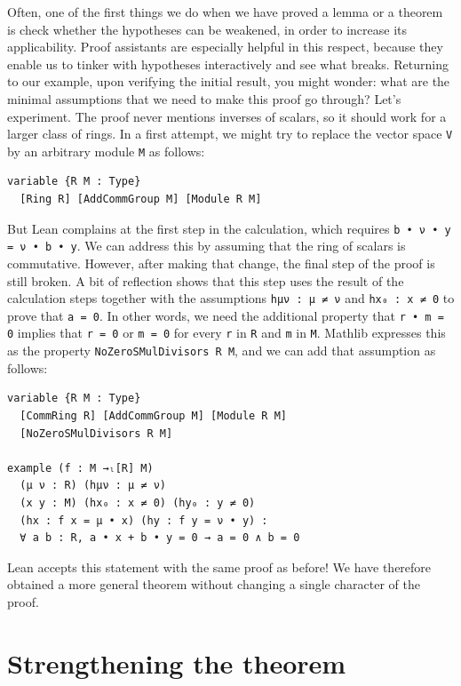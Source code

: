 \documentclass[11pt]{article}
\def\lean{\lstinline[language=lean]}
\begin{document}
Often, one of the first things we do when we have proved a lemma or a theorem is check whether the hypotheses can be weakened, in order to increase its applicability.
Proof assistants are especially helpful in this respect, because they enable us to tinker with hypotheses interactively and see what breaks.
Returning to our example, upon verifying the initial result, you might wonder:
what are the minimal assumptions that we need to make this proof go through?
Let's experiment.
The proof never mentions inverses of scalars,
so it should work for a larger class of rings.
In a first attempt, we might try to replace the vector space \lstinline{V}
by an arbitrary module \lstinline{M} as follows:
\begin{lstlisting}
variable {R M : Type}
  [Ring R] [AddCommGroup M] [Module R M]
\end{lstlisting}
But Lean complains at
the first step in the calculation, which requires
\lean"b • ν • y = ν • b • y".
We can address this by assuming
that the ring of scalars is commutative.
However, after making that change, the final step of the proof is still broken.
A bit of reflection shows that this step uses
the result of the calculation steps together with the assumptions
\lean"hμν : μ ≠ ν" and \lean"hx₀ : x ≠ 0"
to prove that \lean"a = 0".
In other words, we need the additional property that
\lstinline{r • m = 0} implies
that \lstinline{r = 0} or \lstinline{m = 0} for every \lstinline{r} in
\lstinline{R} and \lstinline{m} in \lstinline{M}.
Mathlib expresses this as the property \lean"NoZeroSMulDivisors R M",
and we can add that assumption as follows:
\begin{lstlisting}
variable {R M : Type}
  [CommRing R] [AddCommGroup M] [Module R M]
  [NoZeroSMulDivisors R M]

example (f : M →ₗ[R] M)
  (μ ν : R) (hμν : μ ≠ ν)
  (x y : M) (hx₀ : x ≠ 0) (hy₀ : y ≠ 0)
  (hx : f x = μ • x) (hy : f y = ν • y) :
  ∀ a b : R, a • x + b • y = 0 → a = 0 ∧ b = 0
\end{lstlisting}
Lean accepts this statement with the same proof as before!
We have therefore obtained a more general theorem without changing a single character of the proof.


\section*{Strengthening the theorem}
\end{document}
